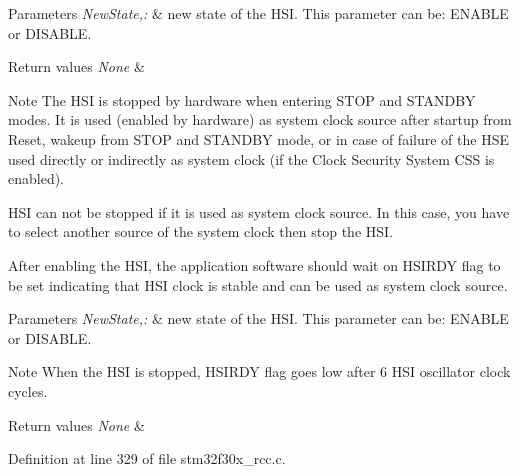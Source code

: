 \begin{DoxyParams}{Parameters}
{\em New\-State,\-:} & new state of the H\-S\-I. This parameter can be\-: E\-N\-A\-B\-L\-E or D\-I\-S\-A\-B\-L\-E. \\
\hline
\end{DoxyParams}

\begin{DoxyRetVals}{Return values}
{\em None} & \\
\hline
\end{DoxyRetVals}
\begin{DoxyNote}{Note}
The H\-S\-I is stopped by hardware when entering S\-T\-O\-P and S\-T\-A\-N\-D\-B\-Y modes. It is used (enabled by hardware) as system clock source after startup from Reset, wakeup from S\-T\-O\-P and S\-T\-A\-N\-D\-B\-Y mode, or in case of failure of the H\-S\-E used directly or indirectly as system clock (if the Clock Security System C\-S\-S is enabled). 

H\-S\-I can not be stopped if it is used as system clock source. In this case, you have to select another source of the system clock then stop the H\-S\-I. 

After enabling the H\-S\-I, the application software should wait on H\-S\-I\-R\-D\-Y flag to be set indicating that H\-S\-I clock is stable and can be used as system clock source. 
\end{DoxyNote}

\begin{DoxyParams}{Parameters}
{\em New\-State,\-:} & new state of the H\-S\-I. This parameter can be\-: E\-N\-A\-B\-L\-E or D\-I\-S\-A\-B\-L\-E. \\
\hline
\end{DoxyParams}
\begin{DoxyNote}{Note}
When the H\-S\-I is stopped, H\-S\-I\-R\-D\-Y flag goes low after 6 H\-S\-I oscillator clock cycles. 
\end{DoxyNote}

\begin{DoxyRetVals}{Return values}
{\em None} & \\
\hline
\end{DoxyRetVals}


Definition at line 329 of file stm32f30x\-\_\-rcc.\-c.

